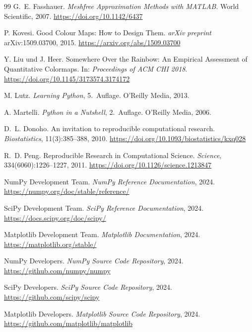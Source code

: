 \documentclass[12pt, a4paper]{article}
\begin{document}
\begin{thebibliography}{99}
G.~E. Fasshauer.
\textit{Meshfree Approximation Methods with {MATLAB}}.
World Scientific, 2007.
\url{https://doi.org/10.1142/6437}


P. Kovesi.
Good Colour Maps: How to Design Them.
\textit{arXiv preprint} arXiv:1509.03700, 2015.
\url{https://arxiv.org/abs/1509.03700}

Y. Liu und J. Heer.
Somewhere Over the Rainbow: An Empirical Assessment of Quantitative Colormaps.
In: \textit{Proceedings of ACM CHI 2018}.
\url{https://doi.org/10.1145/3173574.3174172}


M. Lutz.
\textit{Learning Python}, 5.~Auflage.
O'Reilly Media, 2013.

A. Martelli.
\textit{Python in a Nutshell}, 2.~Auflage.
O'Reilly Media, 2006.


D.~L. Donoho.
An invitation to reproducible computational research.
\textit{Biostatistics}, 11(3):385--388, 2010.
\url{https://doi.org/10.1093/biostatistics/kxq028}

R.~D. Peng.
Reproducible Research in Computational Science.
\textit{Science}, 334(6060):1226--1227, 2011.
\url{https://doi.org/10.1126/science.1213847}


NumPy Development Team.
\textit{{NumPy} Reference Documentation}, 2024.
\url{https://numpy.org/doc/stable/reference/}

SciPy Development Team.
\textit{{SciPy} Reference Documentation}, 2024.
\url{https://docs.scipy.org/doc/scipy/}

Matplotlib Development Team.
\textit{{Matplotlib} Documentation}, 2024.
\url{https://matplotlib.org/stable/}

NumPy Developers.
\textit{{NumPy} Source Code Repository}, 2024.
\url{https://github.com/numpy/numpy}

SciPy Developers.
\textit{{SciPy} Source Code Repository}, 2024.
\url{https://github.com/scipy/scipy}

Matplotlib Developers.
\textit{{Matplotlib} Source Code Repository}, 2024.
\url{https://github.com/matplotlib/matplotlib}

\end{thebibliography}
\end{document}
